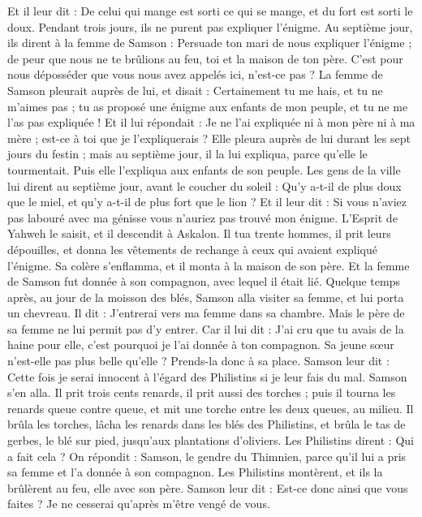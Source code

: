 \begin{multicols}{2}
Et il leur dit : De celui qui mange est sorti ce qui se mange, et du fort est sorti le doux. Pendant trois jours, ils ne purent pas expliquer l'énigme.
Au septième jour, ils dirent à la femme de Samson : Persuade ton mari de nous expliquer l'énigme ; de peur que nous ne te brûlions au feu, toi et la maison de ton père. C'est pour nous déposséder que vous nous avez appelés ici, n'est-ce pas ?
La femme de Samson pleurait auprès de lui, et disait : Certainement tu me hais, et tu ne m'aimes pas ; tu as proposé une énigme aux enfants de mon peuple, et tu ne me l'as pas expliquée ! Et il lui répondait : Je ne l'ai expliquée ni à mon père ni à ma mère ; est-ce à toi que je l'expliquerais ?
Elle pleura auprès de lui durant les sept jours du festin ; mais au septième jour, il la lui expliqua, parce qu'elle le tourmentait. Puis elle l'expliqua aux enfants de son peuple.
Les gens de la ville lui dirent au septième jour, avant le coucher du soleil : Qu'y a-t-il de plus doux que le miel, et qu'y a-t-il de plus fort que le lion ? Et il leur dit : Si vous n'aviez pas labouré avec ma génisse vous n'auriez pas trouvé mon énigme.
L'Esprit de Yahweh le saisit, et il descendit à Askalon. Il tua trente hommes, il prit leurs dépouilles, et donna les vêtements de rechange à ceux qui avaient expliqué l'énigme. Sa colère s'enflamma, et il monta à la maison de son père.
Et la femme de Samson fut donnée à son compagnon, avec lequel il était lié.
\VerseOne{}Quelque temps après, au jour de la moisson des blés, Samson alla visiter sa femme, et lui porta un chevreau. Il dit : J'entrerai vers ma femme dans sa chambre. Mais le père de sa femme ne lui permit pas d'y entrer.
Car il lui dit : J'ai cru que tu avais de la haine pour elle, c'est pourquoi je l'ai donnée à ton compagnon. Sa jeune sœur n'est-elle pas plus belle qu'elle ? Prends-la donc à sa place.
Samson leur dit : Cette fois je serai innocent à l'égard des Philistins si je leur fais du mal.
Samson s'en alla. Il prit trois cents renards, il prit aussi des torches ; puis il tourna les renards queue contre queue, et mit une torche entre les deux queues, au milieu.
Il brûla les torches, lâcha les renards dans les blés des Philistins, et brûla le tas de gerbes, le blé sur pied, jusqu'aux plantations d'oliviers.
Les Philistins dirent : Qui a fait cela ? On répondit : Samson, le gendre du Thimnien, parce qu'il lui a pris sa femme et l'a donnée à son compagnon. Les Philistins montèrent, et ils la brûlèrent au feu, elle avec son père.
Samson leur dit : Est-ce donc ainsi que vous faites ? Je ne cesserai qu'après m'être vengé de vous.

\end{multicols}
